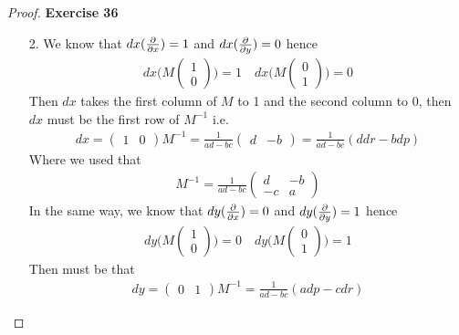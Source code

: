 \documentclass[11pt]{article}
\theoremstyle{definition}
\begin{document}
\begin{proof}{\textbf{Exercise 36}}
\begin{itemize}
\cleardoublepage
\item [2.] We know that $dx(\pdv{}{x}) = 1$ and $dx(\pdv{}{y}) = 0$ hence
\begin{align*}
    dx \bigg(M \begin{pmatrix} 1 \\[8pt] 0 \end{pmatrix}\bigg) = 1
    \quad
    dx \bigg(M \begin{pmatrix} 0 \\[8pt] 1 \end{pmatrix}\bigg) = 0
\end{align*}
Then $dx$ takes the first column of $M$ to 1 and the second column to 0,
then $dx$ must be the first row of $M^{-1}$ i.e.
\begin{align*}
    dx = \begin{pmatrix} 1 & 0 \end{pmatrix}M^{-1}
    = \frac{1}{ad - bc}\begin{pmatrix} d & -b \end{pmatrix}
    = \frac{1}{ad - bc} (ddr - bdp)
\end{align*}
Where we used that
\begin{align*}
    M^{-1} = \frac{1}{ad - bc} \begin{pmatrix}d & -b \\ -c & a\end{pmatrix}
\end{align*}
In the same way, we know that $dy(\pdv{}{x}) = 0$ and $dy(\pdv{}{y}) = 1$ hence
\begin{align*}
    dy \bigg(M \begin{pmatrix} 1 \\[8pt] 0 \end{pmatrix}\bigg) = 0
    \quad
    dy \bigg(M \begin{pmatrix} 0 \\[8pt] 1 \end{pmatrix}\bigg) = 1
\end{align*}
Then must be that
\begin{align*}
    dy = \begin{pmatrix} 0 & 1 \end{pmatrix}M^{-1}
    = \frac{1}{ad - bc} (adp -cdr)
\end{align*}


\end{itemize}
\end{proof}
\end{document}
